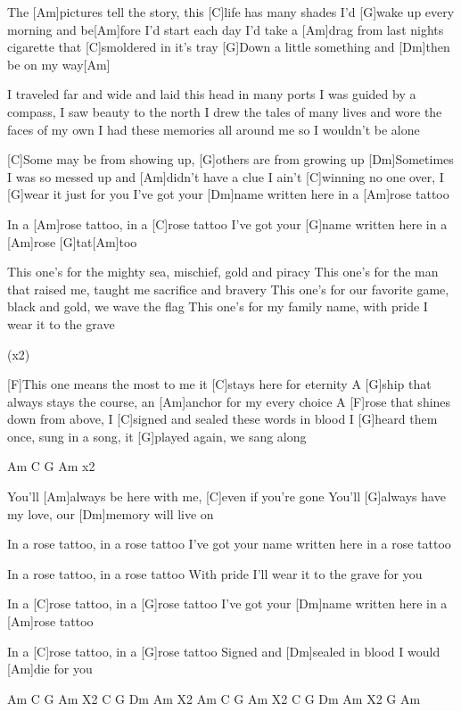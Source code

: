 \begin{guitar}
	The [Am]pictures tell the story, this [C]life has many shades
	I’d [G]wake up every morning and be[Am]fore I’d start each day
	I’d take a [Am]drag from last nights cigarette that [C]smoldered in it’s tray
	[G]Down a little something and [Dm]then be on my way[Am]{}
	
	I traveled far and wide and laid this head in many ports
	I was guided by a compass, I saw beauty to the north
	I drew the tales of many lives and wore the faces of my own 
	I had these memories all around me so I wouldn’t be alone
	
	[C]Some may be from showing up, [G]others are from growing up
	[Dm]Sometimes I was so messed up and [Am]didn’t have a clue
	I ain’t [C]winning no one over, I [G]wear it just for you
	I’ve got your [Dm]name written here in a [Am]rose tattoo
	
	In a [Am]rose tattoo, in a [C]rose tattoo
	I’ve got your [G]name written here in a [Am]rose [G]tat[Am]too
	
	This one's for the mighty sea, mischief, gold and piracy
	This one's for the man that raised me, taught me sacrifice and bravery
	This one's for our favorite game, black and gold, we wave the flag
	This one's for my family name, with pride I wear it to the grave
	
	 
	
	  (x2)
	
	\pagebreak
	
	[F]This one means the most to me it [C]stays here for eternity
	A [G]ship that always stays the course, an [Am]anchor for my every choice
	A [F]rose that shines down from above, I [C]signed and sealed these words in blood
	I [G]heard them once, sung in a song, it [G]played again, we sang along
	
	Am  C  G  Am  x2
	
	You’ll [Am]always be here with me, [C]even if you’re gone
	You’ll [G]always have my love, our [Dm]memory will live on
	
	 
	
	In a rose tattoo, in a rose tattoo
	I’ve got your name written here in a rose tattoo
	
	In a rose tattoo, in a rose tattoo
	With pride I'll wear it to the grave for you
	
	In a [C]rose tattoo, in a [G]rose tattoo
	I’ve got your [Dm]name written here in a [Am]rose tattoo
	
	In a [C]rose tattoo, in a [G]rose tattoo
	Signed and [Dm]sealed in blood I would [Am]die for you
	
	Am C G Am X2   C G Dm Am X2   Am C G Am X2   C G Dm Am X2   G Am
	
\end{guitar}